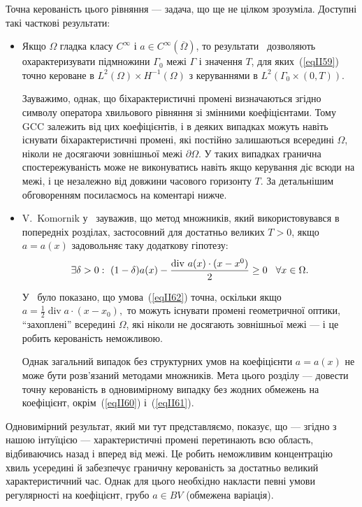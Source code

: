 Точна керованість цього рівняння — задача, що ще не цілком зрозуміла. Доступні такі часткові результати:
\begin{itemize}
\item Якщо $\Omega$ гладка класу $C^\infty$ і $a \in C^\infty(\overline{\Omega})$, то результати~\cite{bardos1992sharp} дозволяють охарактеризувати підмножини $\Gamma_0$ межі $\Gamma$ і значення $T$, для яких~(\ref{eqII59}) точно кероване в $L^2(\Omega) \times H^{-1}(\Omega)$ з керуваннями в $L^2(\Gamma_0 \times (0, T))$.

Зауважимо, однак, що біхарактеристичні промені визначаються згідно символу оператора хвильового рівняння зі змінними коефіцієнтами. Тому GCC залежить від цих коефіцієнтів, і в деяких випадках можуть навіть існувати біхарактеристичні промені, які постійно залишаються всередині $\Omega$, ніколи не досягаючи зовнішньої межі $\partial\Omega$. У таких випадках гранична спостережуваність може не виконуватись навіть якщо керування діє всюди на межі, і це незалежно від довжини часового горизонту $T$. За детальнішим обговоренням посилаємось на коментарі нижче.

\item V.~Komornik у~\cite{komornik1989exact} зауважив, що метод множників, який використовувався в попередніх розділах, застосовний для достатньо великих $T>0$, якщо $a = a(x)$ задовольняє таку додаткову гіпотезу:
\begin{equation}\label{eqII62}
    \exists \delta > 0:\ (1 - \delta) a(x) - \frac{\operatorname{div}\, a(x) \cdot (x-x^0)}{2} \geq 0  \hspace{0.3cm} \forall x \in \Omega.
\end{equation}


У~\cite{macia2002zuazua} було показано, що умова~(\ref{eqII62}) точна, оскільки якщо
$
    a = \frac{1}{2} \operatorname{div} a \cdot (x - x_0),
$
то можуть існувати промені геометричної оптики, ``захоплені'' всередині $\Omega$, які ніколи не досягають зовнішньої межі — і це робить керованість неможливою.

Однак загальний випадок без структурних умов на коефіцієнти $a=a(x)$ не може бути розв'язаний методами множників.
Мета цього розділу — довести точну керованість в одновимірному випадку без жодних обмежень на коефіцієнт, окрім~(\ref{eqII60}) і~(\ref{eqII61}).
\end{itemize}
Одновимірний результат, який ми тут представляємо, показує, що — згідно з нашою інтуїцією — характеристичні промені перетинають всю область, відбиваючись назад і вперед від межі. Це робить неможливим концентрацію хвиль усередині й забезпечує граничну керованість за достатньо великий характеристичний час. Однак для цього необхідно накласти певні умови регулярності на коефіцієнт, грубо $a \in BV$ (обмежена варіація).

